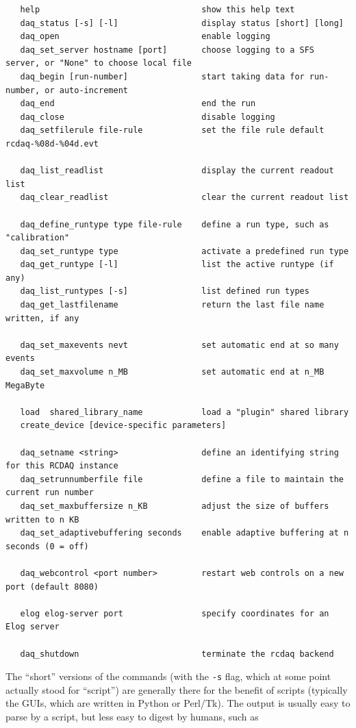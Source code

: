 \documentclass{article}[11pt]
\begin{document}
\begin{verbatim}
   help                                 show this help text
   daq_status [-s] [-l]                 display status [short] [long]
   daq_open                             enable logging
   daq_set_server hostname [port]       choose logging to a SFS server, or "None" to choose local file
   daq_begin [run-number]             	start taking data for run-number, or auto-increment
   daq_end                              end the run 
   daq_close                            disable logging
   daq_setfilerule file-rule            set the file rule default rcdaq-%08d-%04d.evt

   daq_list_readlist                    display the current readout list
   daq_clear_readlist                   clear the current readout list 

   daq_define_runtype type file-rule    define a run type, such as "calibration"
   daq_set_runtype type                 activate a predefined run type
   daq_get_runtype [-l]                 list the active runtype (if any)
   daq_list_runtypes [-s]               list defined run types
   daq_get_lastfilename                 return the last file name written, if any

   daq_set_maxevents nevt               set automatic end at so many events
   daq_set_maxvolume n_MB               set automatic end at n_MB MegaByte

   load  shared_library_name            load a "plugin" shared library
   create_device [device-specific parameters] 

   daq_setname <string>                 define an identifying string for this RCDAQ instance
   daq_setrunnumberfile file            define a file to maintain the current run number
   daq_set_maxbuffersize n_KB           adjust the size of buffers written to n KB
   daq_set_adaptivebuffering seconds    enable adaptive buffering at n seconds (0 = off)

   daq_webcontrol <port number>         restart web controls on a new port (default 8080)

   elog elog-server port                specify coordinates for an Elog server

   daq_shutdown                         terminate the rcdaq backend
\end{verbatim} 

The ``short'' versions of the commands (with the \verb|-s| flag, which
at some point actually stood for ``script'') are generally there for
the benefit of scripts (typically the GUIs, which are written in
Python or Perl/Tk). The output is  usually easy to parse by a script, but less easy
to digest by humans, such as
\end{document}
